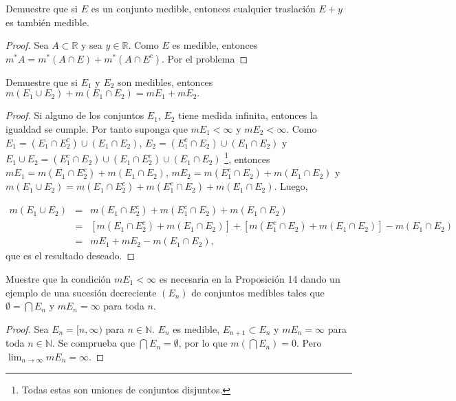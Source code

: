 \documentclass[12pt]{article}
\newcommand{\N}{\mathbb{N}}
\newcommand{\R}{\mathbb{R}}
\newenvironment{problem}[2][Problema]{\begin{trivlist}
\item[\hskip \labelsep {\bfseries #1}\hskip \labelsep {\bfseries #2.}]}{\end{trivlist}}
\begin{document}
\begin{problem}{9}
Demuestre que si $E$ es un conjunto medible, entonces cualquier traslación $E + y$ es también medible.
\end{problem}

\begin{proof}
Sea $A \subset \R$ y sea $y \in \R$. Como $E$ es medible, entonces $m^* A =   m^*(A \cap E) + m^*(A \cap E^c).$ Por el problema 

\end{proof}



\begin{problem}{10}
Demuestre que si $E_1$ y $E_2$ son medibles, entonces $m(E_1 \cup E_2) + m(E_1 \cap E_2) = m E_1 + m E_2. $
\end{problem}
\begin{proof}
Si alguno de los conjuntos $E_1$, $E_2$ tiene medida infinita, entonces la igualdad se cumple. Por tanto suponga que $m E_1 < \infty $ y $m E_2 < \infty$. Como $E_1 = (E_1 \cap E_2^c) \cup (E_1 \cap E_2)$,  $E_2 = (E_1^c \cap E_2) \cup (E_1 \cap E_2)$ y $E_1 \cup E_2 = (E_1^c \cap E_2) \cup (E_1 \cap E_2^c)  \cup (E_1 \cap E_2)$ \footnote[3]{Todas estas son uniones de conjuntos disjuntos.}, entonces 
$mE_1 = m(E_1 \cap E_2^c) + m(E_1 \cap E_2) $,  $mE_2 = m(E_1^c \cap E_2) + m(E_1 \cap E_2)$ y $m(E_1 \cup E_2) = m(E_1 \cap E_2^c) + m(E_1^c \cap E_2) + m(E_1 \cap E_2)$. Luego,

\begin{eqnarray*}
m (E_1\cup E_2) &=& m(E_1 \cap E_2^c) + m(E_1^c \cap E_2) + m(E_1 \cap E_2)\\
                &=& [m(E_1 \cap E_2^c) + m(E_1 \cap E_2)] + [m(E_1^c \cap E_2) + m(E_1 \cap E_2)] - m(E_1 \cap E_2) \\
                &=& m E_1 + mE_2 - m(E_1 \cap E_2),
\end{eqnarray*}
que es el resultado deseado.

\end{proof}


\begin{problem}{11}
Muestre que la condición $m E_1 < \infty$ es necesaria en la Proposición 14 dando un ejemplo de una sucesión decreciente $(E_n)$ de conjuntos medibles tales que $\emptyset = \bigcap E_n$ y $m E_n = \infty $ para toda $n$.
\end{problem}
\begin{proof}

Sea $E_n = [n, \infty)$ para $n \in \N$. $E_n$ es medible, $E_{n+1} \subset E_n$ y $m E_n = \infty $ para toda $n \in \N$. Se comprueba que $\bigcap E_n  = \emptyset$, por lo que $m( \bigcap E_n) = 0$. Pero $\lim_{n \to \infty} m E_n = \infty.$
    
\end{proof}
\end{document}
